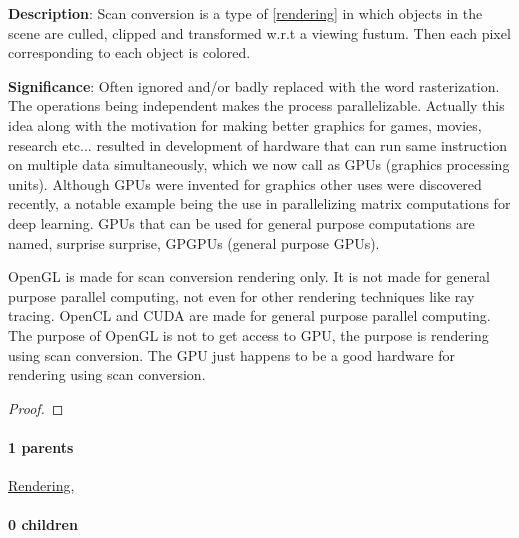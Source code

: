 \documentclass[./main.tex]{subfiles}
\begin{document}
\begin{statement}
\label{statement:Scan conversion}\hspace*{0pt}\par
\end{statement}
\textbf{Description}:
Scan conversion is a type of [\hyperref[statement:Rendering]{rendering}] in which objects in the scene are culled, clipped and transformed w.r.t a viewing fustum.
Then each pixel corresponding to each object is colored.
\par
{\color{magenta} \textbf{Significance}:
Often ignored and/or badly replaced with the word rasterization.
The operations being independent makes the process parallelizable.
Actually this idea along with the motivation for making better graphics for games, movies, research etc... resulted in development of hardware that can run same instruction on multiple data simultaneously, which we now call as GPUs (graphics processing units).
Although GPUs were invented for graphics other uses were discovered recently, a notable example being the use in parallelizing matrix computations for deep learning.
GPUs that can be used for general purpose computations are named, surprise surprise, GPGPUs (general purpose GPUs).

OpenGL is made for scan conversion rendering only.
It is not made for general purpose parallel computing, not even for other rendering techniques like ray tracing.
OpenCL and CUDA are made for general purpose parallel computing.
The purpose of OpenGL is not to get access to GPU, the purpose is rendering using scan conversion.
The GPU just happens to be a good hardware for rendering using scan conversion.
\par}
\begin{proof}
\proofbydefinition
\end{proof}\par
\paragraph{1 parents} \hyperref[statement:Rendering]{Rendering}, 
\paragraph{0 children} 
\end{document}
